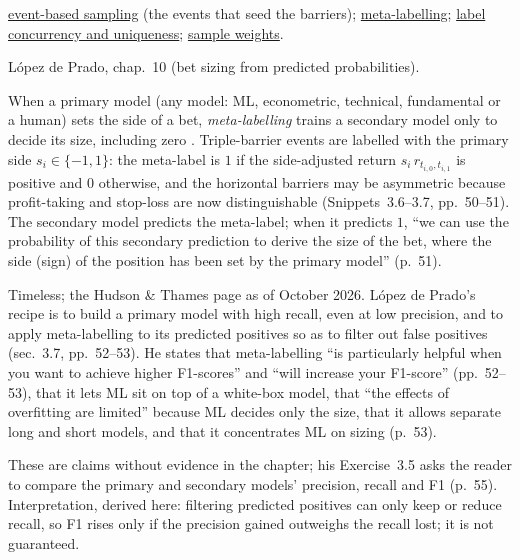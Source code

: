 \begin{qfmethod}
 \hyperref[meth:event-based-sampling]{event-based sampling} (the events that seed the barriers); \hyperref[meth:meta-labelling]{meta-labelling}; \hyperref[def:label-concurrency-uniqueness]{label concurrency and uniqueness}; \hyperref[meth:sample-weights-attribution-decay]{sample weights}.

 López de Prado, chap.~10 (bet sizing from predicted probabilities).

\end{qfmethod}

\begin{qfmethod}\label{meth:meta-labelling}
 When a primary model (any model: ML, econometric, technical, fundamental or a human) sets the side of a bet, \emph{meta-labelling} trains a secondary model only to decide its size, including zero \citep[chap.~3, secs.~3.6 and~3.8, pp.~50 and~53--54]{alpha-afml}. Triple-barrier events are labelled with the primary side $s_i\in\{-1,1\}$: the meta-label is $1$ if the side-adjusted return $s_i\,r_{t_{i,0},t_{i,1}}$ is positive and $0$ otherwise, and the horizontal barriers may be asymmetric because profit-taking and stop-loss are now distinguishable (Snippets~3.6--3.7, pp.~50--51). The secondary model predicts the meta-label; when it predicts $1$, ``we can use the probability of this secondary prediction to derive the size of the bet, where the side (sign) of the position has been set by the primary model'' (p.~51).

 Timeless; the Hudson \& Thames page as of October 2026. López de Prado's recipe is to build a primary model with high recall, even at low precision, and to apply meta-labelling to its predicted positives so as to filter out false positives (sec.~3.7, pp.~52--53). He states that meta-labelling ``is particularly helpful when you want to achieve higher F1-scores'' and ``will increase your F1-score'' (pp.~52--53), that it lets ML sit on top of a white-box model, that ``the effects of overfitting are limited'' because ML decides only the size, that it allows separate long and short models, and that it concentrates ML on sizing (p.~53).

These are claims without evidence in the chapter; his Exercise~3.5 asks the reader to compare the primary and secondary models' precision, recall and F1 (p.~55). Interpretation, derived here: filtering predicted positives can only keep or reduce recall, so F1 rises only if the precision gained outweighs the recall lost; it is not guaranteed.


\end{qfmethod}
